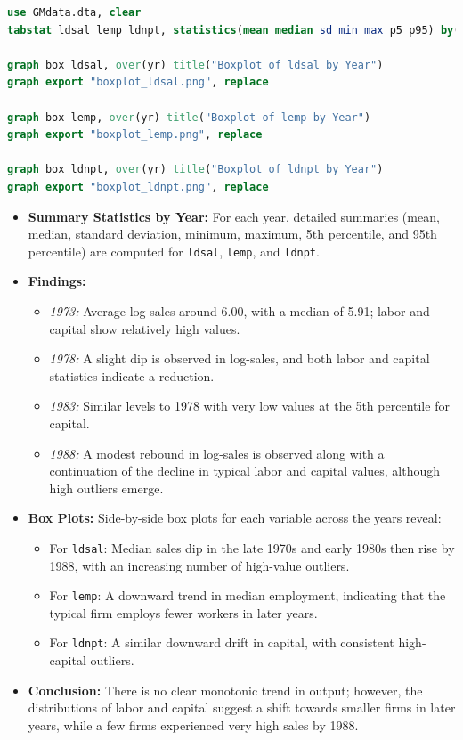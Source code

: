\documentclass[a4paper,12pt]{article} %
\theoremstyle{nonitalic}
\newenvironment{solution}[1]
  {\renewcommand\theinnercustomsol{#1}\innercustomsol}
  {\endinnercustomsol}
\newcounter{solutionctr}
\renewcommand{\thesolutionctr}{(\alph{solutionctr})}
\newenvironment{autosolution}
  {\stepcounter{solutionctr}\begin{solution}{\thesolutionctr}}
  {\end{solution}}
\begin{document}
\begin{autosolution}
\begin{lstlisting}[language=stata] 
use GMdata.dta, clear
tabstat ldsal lemp ldnpt, statistics(mean median sd min max p5 p95) by(yr)
    
graph box ldsal, over(yr) title("Boxplot of ldsal by Year")
graph export "boxplot_ldsal.png", replace
    
graph box lemp, over(yr) title("Boxplot of lemp by Year")
graph export "boxplot_lemp.png", replace
    
graph box ldnpt, over(yr) title("Boxplot of ldnpt by Year")
graph export "boxplot_ldnpt.png", replace
\end{lstlisting}

\begin{itemize}
    \item \textbf{Summary Statistics by Year:} For each year, detailed summaries (mean, median, standard deviation, minimum, maximum, 5th percentile, and 95th percentile) are computed for \texttt{ldsal}, \texttt{lemp}, and \texttt{ldnpt}.
    \item \textbf{Findings:}
    \begin{itemize}
        \item \emph{1973:} Average log-sales around 6.00, with a median of 5.91; labor and capital show relatively high values.
        \item \emph{1978:} A slight dip is observed in log-sales, and both labor and capital statistics indicate a reduction.
        \item \emph{1983:} Similar levels to 1978 with very low values at the 5th percentile for capital.
        \item \emph{1988:} A modest rebound in log-sales is observed along with a continuation of the decline in typical labor and capital values, although high outliers emerge.
    \end{itemize}
    \item \textbf{Box Plots:} Side-by-side box plots for each variable across the years reveal:
    \begin{itemize}
        \item For \texttt{ldsal}: Median sales dip in the late 1970s and early 1980s then rise by 1988, with an increasing number of high-value outliers.
        \item For \texttt{lemp}: A downward trend in median employment, indicating that the typical firm employs fewer workers in later years.
        \item For \texttt{ldnpt}: A similar downward drift in capital, with consistent high-capital outliers.
    \end{itemize}
    \item \textbf{Conclusion:} There is no clear monotonic trend in output; however, the distributions of labor and capital suggest a shift towards smaller firms in later years, while a few firms experienced very high sales by 1988.
\end{itemize}
\end{autosolution}
\end{document}
